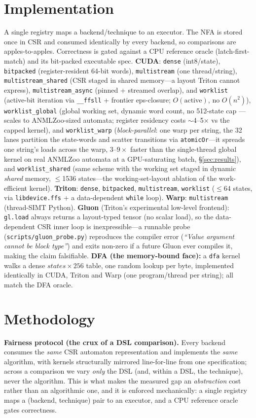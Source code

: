 \documentclass[conference]{IEEEtran}
\begin{document}
\section{Implementation}\label{sec:impl}
A single registry maps a backend/technique to an executor. The NFA is stored once in CSR
and consumed identically by every backend, so comparisons are apples-to-apples.
Correctness is gated against a CPU reference oracle (latch-first-match) and its bit-packed
executable spec.
\textbf{CUDA}: \texttt{dense} (int8/state), \texttt{bitpacked} (register-resident 64-bit
words), \texttt{multistream} (one thread/string), \texttt{multistream\_shared} (CSR staged
in shared memory---a layout Triton cannot express), \texttt{multistream\_async} (pinned +
streamed overlap), and \texttt{worklist} (active-bit iteration via \texttt{\_\_ffsll} +
frontier eps-closure; $O(\text{active})$, no $O(n^2)$), \texttt{worklist\_global}
(global working set, dynamic word count, no 512-state cap --- scales to ANMLZoo-sized
automata; register residency costs $\sim$4--5$\times$ vs the capped kernel), and
\texttt{worklist\_warp} (\emph{block-parallel}: one warp per string, the 32 lanes partition
the state-words and scatter transitions via \texttt{atomicOr}---it spreads one string's loads
across the warp, $3$--$9\times$ faster than the single-thread global kernel on real ANMLZoo
automata at a GPU-saturating batch, \S\ref{sec:results}), and \texttt{worklist\_shared} (same
scheme with the working set staged in dynamic \emph{shared} memory, $\le$1536 states---the
working-set-layout ablation of the work-efficient kernel).
\textbf{Triton}: \texttt{dense}, \texttt{bitpacked}, \texttt{multistream},
\texttt{worklist} ($\le 64$ states, via \texttt{libdevice.ffs} + a data-dependent
\texttt{while} loop). \textbf{Warp}: \texttt{multistream} (thread-SIMT Python).
\textbf{Gluon} (Triton's experimental low-level frontend): \texttt{gl.load} always returns
a layout-typed tensor (no scalar load), so the data-dependent CSR inner loop is
inexpressible---a runnable probe (\texttt{scripts/gluon\_probe.py}) reproduces the
compiler error (\emph{``Value argument cannot be block type''}) and exits non-zero if a
future Gluon ever compiles it, making the claim falsifiable.
\textbf{DFA (the memory-bound face):} a \texttt{dfa} kernel walks a dense
$\textit{states}\times256$ table, one random lookup per byte, implemented identically in
CUDA, Triton and Warp (one program/thread per string); all match the DFA oracle.

\section{Methodology}\label{sec:method}
\textbf{Fairness protocol (the crux of a DSL comparison).} Every backend consumes the
\emph{same} CSR automaton representation and implements the \emph{same} algorithm, with kernels
structurally mirrored line-for-line from one specification; across a comparison we vary
\emph{only} the DSL (and, within a DSL, the technique), never the algorithm. This is what makes
the measured gap an \emph{abstraction} cost rather than an algorithmic one, and it is enforced
mechanically: a single registry maps a (backend, technique) pair to an executor, and a CPU
reference oracle gates correctness.
\end{document}
